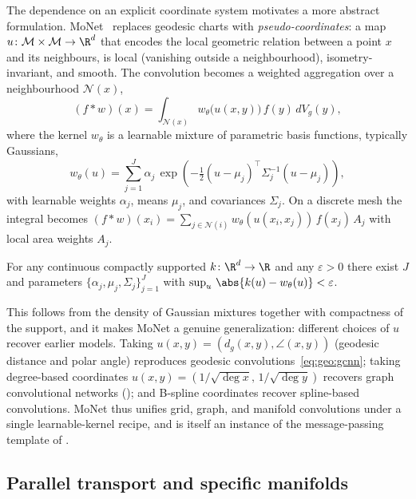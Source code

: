 The dependence on an explicit coordinate system motivates a more abstract
formulation. MoNet~\citep{DBLP:journals/corr/MontiBMRSB16} replaces geodesic
charts with \emph{pseudo-coordinates}: a map $u \colon \M \times \M \to \R^d$
that encodes the local geometric relation between a point $x$ and its neighbours,
is local (vanishing outside a neighbourhood), isometry-invariant, and smooth.
The convolution becomes a weighted aggregation over a neighbourhood
$\mathcal{N}(x)$,
\begin{equation}
\label{eq:geo:monet}
  (f * w)(x) = \int_{\mathcal{N}(x)} w_\theta\big(u(x,y)\big)\, f(y)\, dV_g(y),
\end{equation}
where the kernel $w_\theta$ is a learnable mixture of parametric basis functions,
typically Gaussians,
\[
  w_\theta(u) = \sum_{j=1}^J \alpha_j\,
    \exp\!\left(-\tfrac{1}{2}(u - \mu_j)^\top \Sigma_j^{-1} (u - \mu_j)\right),
\]
with learnable weights $\alpha_j$, means $\mu_j$, and covariances $\Sigma_j$. On
a discrete mesh the integral becomes
$(f * w)(x_i) = \sum_{j \in \mathcal{N}(i)} w_\theta(u(x_i,x_j))\, f(x_j)\, A_j$
with local area weights $A_j$.

\begin{theorem}
\label{thm:geo:monet}
For any continuous compactly supported $k \colon \R^d \to \R$ and any
$\varepsilon > 0$ there exist $J$ and parameters
$\{\alpha_j, \mu_j, \Sigma_j\}_{j=1}^J$ with
$\sup_{u}\, \abs{k(u) - w_\theta(u)} < \varepsilon$.
\end{theorem}

This follows from the density of Gaussian mixtures together with compactness of
the support, and it makes MoNet a genuine generalization: different choices of
$u$ recover earlier models. Taking $u(x,y) = (d_g(x,y), \angle(x,y))$ (geodesic
distance and polar angle) reproduces geodesic
convolutions~\eqref{eq:geo:gcnn}; taking degree-based coordinates
$u(x,y) = (1/\sqrt{\deg x},\, 1/\sqrt{\deg y})$ recovers graph convolutional
networks (); and B-spline coordinates recover spline-based
convolutions. MoNet thus unifies grid, graph, and manifold convolutions under a
single learnable-kernel recipe, and is itself an instance of the message-passing
template of .

\subsection{Parallel transport and specific manifolds}
\label{subsec:geo:specific}

